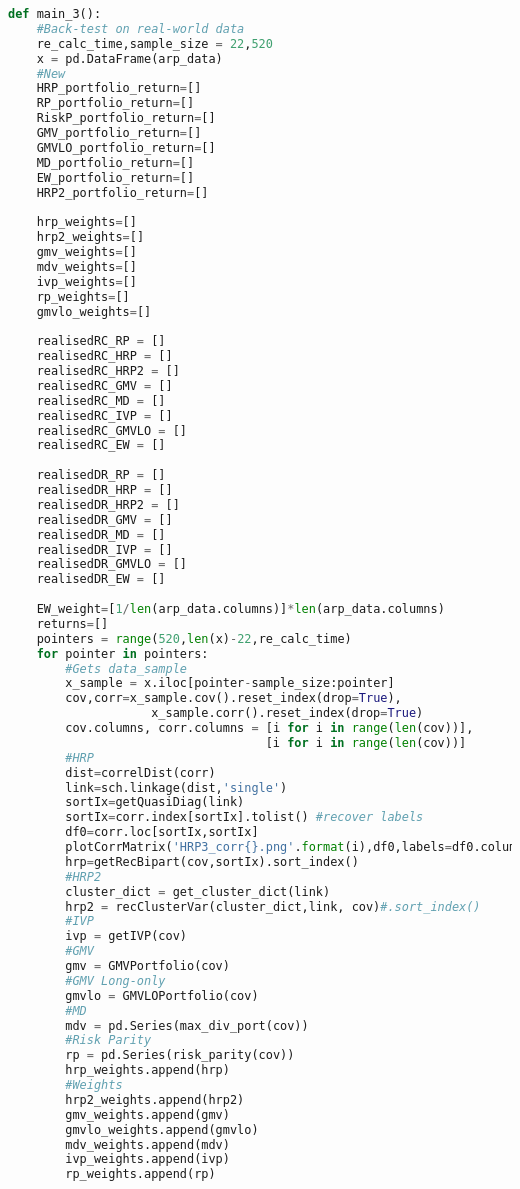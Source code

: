 \begin{lstlisting}[language=Python]
def main_3():
    #Back-test on real-world data
    re_calc_time,sample_size = 22,520
    x = pd.DataFrame(arp_data)
    #New
    HRP_portfolio_return=[]
    RP_portfolio_return=[]
    RiskP_portfolio_return=[]
    GMV_portfolio_return=[]
    GMVLO_portfolio_return=[]
    MD_portfolio_return=[]
    EW_portfolio_return=[]
    HRP2_portfolio_return=[]
    
    hrp_weights=[]
    hrp2_weights=[]
    gmv_weights=[]
    mdv_weights=[]
    ivp_weights=[]
    rp_weights=[]
    gmvlo_weights=[]
    
    realisedRC_RP = []
    realisedRC_HRP = []
    realisedRC_HRP2 = []
    realisedRC_GMV = []
    realisedRC_MD = []
    realisedRC_IVP = []
    realisedRC_GMVLO = []
    realisedRC_EW = []
    
    realisedDR_RP = []
    realisedDR_HRP = []
    realisedDR_HRP2 = []
    realisedDR_GMV = []
    realisedDR_MD = []
    realisedDR_IVP = []
    realisedDR_GMVLO = []
    realisedDR_EW = []
    
    EW_weight=[1/len(arp_data.columns)]*len(arp_data.columns)
    returns=[]
    pointers = range(520,len(x)-22,re_calc_time)
    for pointer in pointers:
        #Gets data_sample
        x_sample = x.iloc[pointer-sample_size:pointer] 
        cov,corr=x_sample.cov().reset_index(drop=True),
                    x_sample.corr().reset_index(drop=True)
        cov.columns, corr.columns = [i for i in range(len(cov))],
                                    [i for i in range(len(cov))]
        #HRP
        dist=correlDist(corr)
        link=sch.linkage(dist,'single')
        sortIx=getQuasiDiag(link)
        sortIx=corr.index[sortIx].tolist() #recover labels
        df0=corr.loc[sortIx,sortIx]
        plotCorrMatrix('HRP3_corr{}.png'.format(i),df0,labels=df0.columns)
        hrp=getRecBipart(cov,sortIx).sort_index()
        #HRP2
        cluster_dict = get_cluster_dict(link)
        hrp2 = recClusterVar(cluster_dict,link, cov)#.sort_index()
        #IVP
        ivp = getIVP(cov)
        #GMV
        gmv = GMVPortfolio(cov)
        #GMV Long-only
        gmvlo = GMVLOPortfolio(cov)
        #MD
        mdv = pd.Series(max_div_port(cov))
        #Risk Parity
        rp = pd.Series(risk_parity(cov))
        hrp_weights.append(hrp)
        #Weights
        hrp2_weights.append(hrp2)
        gmv_weights.append(gmv)
        gmvlo_weights.append(gmvlo)
        mdv_weights.append(mdv)
        ivp_weights.append(ivp)
        rp_weights.append(rp)
        

\end{lstlisting}
